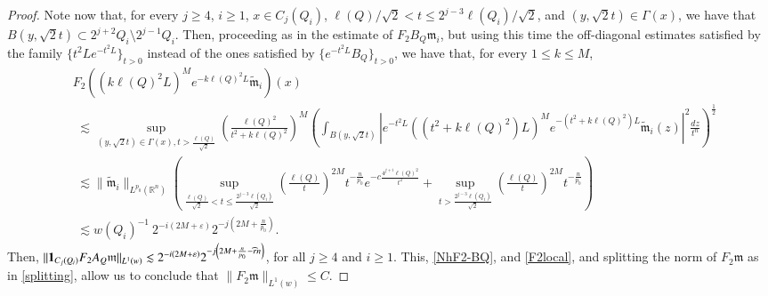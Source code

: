 \documentclass[11pt, a4paper,leqno]{amsart}
\newcommand{\mm}{\mathfrak{m}}
\renewcommand{\chi}{{\bf 1}}
\theoremstyle{plain}
\theoremstyle{definition}
\theoremstyle{remark}
\numberwithin{equation}{section}
\def \R{ \mathbb{R} }
\begin{document}
\begin{proof}
Note now that, for every $j\geq 4$, $i\geq 1$, $x\in C_{j}(Q_i)$, $\ell(Q)/\sqrt{2}<t\leq 2^{j-3}\ell(Q_i)/\sqrt{2}$, and $(y,\sqrt{2}t)\in \Gamma(x)$, we have that
$B(y,\sqrt{2}t)\subset 2^{j+2}Q_i\setminus 2^{j-1}Q_i$.
Then, proceeding as in the estimate of $F_2B_Q\mm_i$, but using this time the  off-diagonal estimates satisfied by the family $\{t^2Le^{-t^2L}\}_{t>0}$ instead of the ones satisfied by $\{e^{-t^2L}B_Q\}_{t>0}$,  we have that, for every $1\leq k\leq M$,
\begin{align*}
&F_2\left((k\ell(Q)^2L)^Me^{-k\ell(Q)^2L}\widetilde{\mm}_i\right)(x)
\\&\,\,
\lesssim
\sup_{(y,\sqrt{2}t)\in \Gamma(x),t>\frac{\ell(Q)}{\sqrt{2}}}
\left(\frac{\ell(Q)^2}{t^2+k\ell(Q)^2}\right)^{M}\left(\int_{B(y,\sqrt{2}t)}\left|e^{-t^2L}((t^2+k\ell(Q)^2)L)^Me^{-\left(t^2+k\ell(Q)^2\right)L}\widetilde{\mm}_i(z)\right|^2\frac{dz}{t^n}
\right)^{\frac{1}{2}}
\\&\,\,
\lesssim \|\widetilde{\mm}_i\|_{L^{p_0}(\R^n)}
\left(\sup_{\frac{\ell(Q)}{\sqrt{2}}<t\leq \frac{2^{j-3}\ell(Q_i)}{\sqrt{2}}}
\left(\frac{\ell(Q)}{t}\right)^{2M}t^{-\frac{n}{p_0}}e^{-c\frac{4^{j+i}\ell(Q)^2}{t^2}}
+\sup_{t>\frac{2^{j-3}\ell(Q_i)}{\sqrt{2}}}\left(\frac{\ell(Q)}{t}\right)^{2M}t^{-\frac{n}{p_0}}\right)
\\&\,\,
\lesssim w(Q_i)^{-1}\
2^{-i\left(2M+\varepsilon\right)}2^{-j\left(2M+\frac{n}{p_0}\right)}
.
\end{align*}
Then, $\|\chi_{C_j(Q_i)}F_2A_Q\mm\|_{L^1(w)}\lesssim 2^{-i\left(2M+\varepsilon\right)}2^{-j\left(2M+\frac{n}{p_0}-\widehat{r}n\right)}$,
for all  $j\geq 4$ and $i\geq 1$. This, \eqref{NhF2-BQ}, and \eqref{F2local}, and splitting the norm of $F_2\mm$ as in \eqref{splitting}, allow us to conclude that 
$
\|F_2\mm\|_{L^1(w)}\leq C.
$


\medskip


\end{proof}
\end{document}
